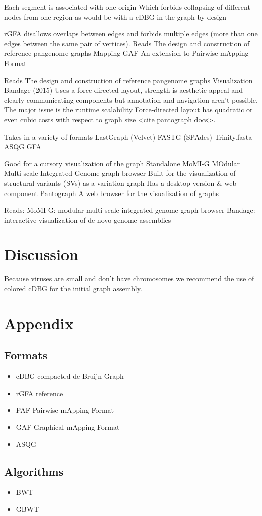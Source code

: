 \documentclass[11pt]{article}
\begin{document}
Each segment is associated with one origin Which forbids collapsing of different nodes from one region as would be with a cDBG  in the graph by design

rGFA disallows overlaps between edges and forbids multiple edges (more than one edges between the same pair of vertices). 
Reads
The design and construction of reference pangenome graphs
Mapping
GAF
An extension to Pairwise mApping Format

Reads
The design and construction of reference pangenome graphs
Visualization
Bandage (2015)
Uses a force-directed layout, strength is aesthetic appeal and clearly communicating components but annotation and navigation aren’t possible. The major issue is the runtime scalability Force-directed layout has quadratic or even cubic costs with respect to graph size <cite pantograph docs>.

Takes in a variety of formats
LastGraph (Velvet)
FASTG (SPAdes)
Trinity.fasta
ASQG 
GFA

Good for a cursory visualization of the graph
Standalone
MoMI-G MOdular Multi-scale Integrated Genome graph browser
Built for the visualization of structural variants (SVs) as a variation graph
Has a desktop version \& web component
Pantograph
A web browser for the visualization of graphs

Reads:
MoMI-G: modular multi-scale integrated genome graph browser
Bandage: interactive visualization of de novo genome assemblies

\section{Discussion}
\label{sec:org379841c}
Because viruses are small and don’t have chromosomes we recommend the use of colored cDBG for the initial graph assembly.

\section{Appendix}
\label{sec:orgd99c318}
\subsection{Formats}
\label{sec:orgcc218de}
\begin{itemize}
\item cDBG compacted de Bruijn Graph
\item rGFA reference
\item PAF Pairwise mApping Format
\item GAF Graphical mApping Format
\item ASQG
\end{itemize}

\subsection{Algorithms}
\label{sec:orgd3ddb9e}
\begin{itemize}
\item BWT
\item GBWT
\end{itemize}
\end{document}
